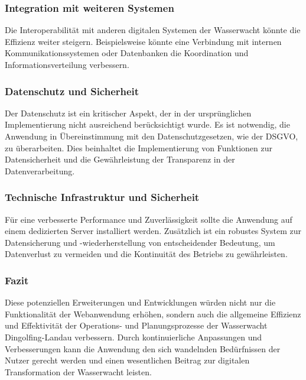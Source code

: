 \documentclass[fontsize=12pt,openright,oneside,paper=a4,BCOR=1cm]{scrbook}
\begin{document}
\subsubsection{Integration mit weiteren Systemen}
Die Interoperabilität mit anderen digitalen Systemen der Wasserwacht könnte die Effizienz weiter steigern. Beispielsweise könnte eine Verbindung mit internen Kommunikationssystemen oder Datenbanken die Koordination und Informationsverteilung verbessern.

\subsubsection{Datenschutz und Sicherheit}
Der Datenschutz ist ein kritischer Aspekt, der in der ursprünglichen Implementierung nicht ausreichend berücksichtigt wurde. Es ist notwendig, die Anwendung in Übereinstimmung mit den Datenschutzgesetzen, wie der DSGVO, zu überarbeiten. Dies beinhaltet die Implementierung von Funktionen zur Datensicherheit und die Gewährleistung der Transparenz in der Datenverarbeitung.

\subsubsection{Technische Infrastruktur und Sicherheit}
Für eine verbesserte Performance und Zuverlässigkeit sollte die Anwendung auf einem dedizierten Server installiert werden. Zusätzlich ist ein robustes System zur Datensicherung und -wiederherstellung von entscheidender Bedeutung, um Datenverlust zu vermeiden und die Kontinuität des Betriebs zu gewährleisten.

\subsubsection{Fazit}

Diese potenziellen Erweiterungen und Entwicklungen würden nicht nur die Funktionalität der Webanwendung erhöhen, sondern auch die allgemeine Effizienz und Effektivität der Operations- und Planungsprozesse der Wasserwacht Dingolfing-Landau verbessern. Durch kontinuierliche Anpassungen und Verbesserungen kann die Anwendung den sich wandelnden Bedürfnissen der Nutzer gerecht werden und einen wesentlichen Beitrag zur digitalen Transformation der Wasserwacht leisten.


%
%

\end{document}
